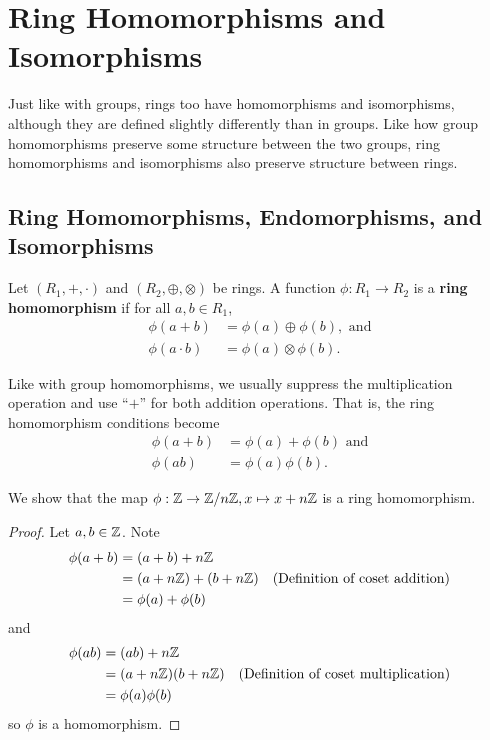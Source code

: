 \chapter{Ring Homomorphisms and Isomorphisms}
Just like with groups, rings too have homomorphisms and isomorphisms, although they are defined slightly differently than in groups. Like how group homomorphisms preserve some structure between the two groups, ring homomorphisms and isomorphisms also preserve structure between rings.

\section{Ring Homomorphisms, Endomorphisms, and Isomorphisms}
\begin{definition}
    Let $(R_1, +, \cdot)$ and $(R_2, \oplus, \otimes)$ be rings. A function $\phi: R_1 \to R_2$ is a \textbf{ring homomorphism} if for all $a, b \in R_1$,
    \begin{align*}
        \phi(a+b) &= \phi(a) \oplus \phi(b), \text{ and}\\
        \phi(a\cdot b) &= \phi(a)\otimes\phi(b).
    \end{align*}
\end{definition}
\begin{remark}
    Like with group homomorphisms, we usually suppress the multiplication operation and use ``$+$'' for both addition operations. That is, the ring homomorphism conditions become
    \begin{align*}
        \phi(a+b) &= \phi(a) + \phi(b) \text{ and}\\
        \phi(ab) &= \phi(a)\phi(b).
    \end{align*}
\end{remark}

\begin{example}
    We show that the map $\phi: \mathbb{Z} \to \mathbb{Z}/n\mathbb{Z}, x \mapsto x + n\mathbb{Z}$ is a ring homomorphism.
     
    \begin{proof}
        Let $a, b \in \mathbb{Z}$. Note
        \begin{align*}
            \phi(a+b) &= (a+b) + n\mathbb{Z}\\
            &= (a + n\mathbb{Z}) + (b + n\mathbb{Z}) & (\text{Definition of coset addition})\\
            &=\phi(a)+\phi(b)
        \end{align*}
        and
        \begin{align*}
            \phi(ab) &= (ab) + n\mathbb{Z}\\
            &= (a + n\mathbb{Z})(b + n\mathbb{Z}) & (\text{Definition of coset multiplication})\\
            &= \phi(a)\phi(b)
        \end{align*}
        so $\phi$ is a homomorphism.
    \end{proof}
\end{example}

